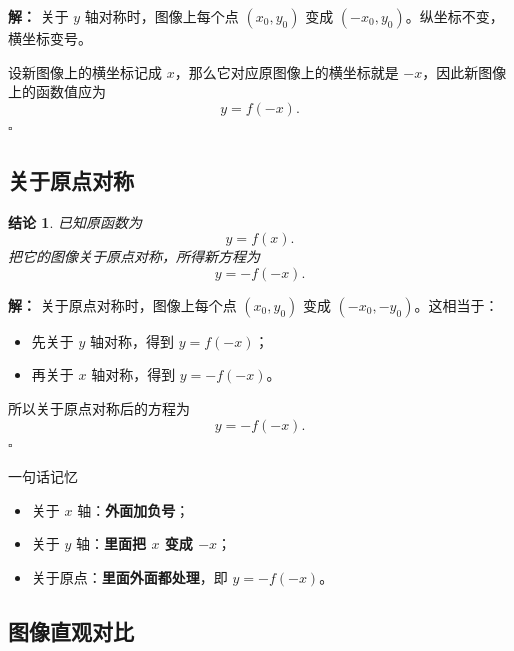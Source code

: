 \documentclass[11pt,a4paper,fontset=fandol]{ctexart}
\theoremstyle{formaltheorem}
\newtheorem{theorem}{结论}[section]
\theoremstyle{formalexample}
\newenvironment{solution}{\par\noindent\textbf{解：}}{\hfill$\square$\par}
\begin{document}
\begin{solution}
关于 $y$ 轴对称时，图像上每个点 $(x_0,y_0)$ 变成 $(-x_0,y_0)$。纵坐标不变，横坐标变号。

设新图像上的横坐标记成 $x$，那么它对应原图像上的横坐标就是 $-x$，因此新图像上的函数值应为
\[
y=f(-x).
\]
\end{solution}

\subsection{关于原点对称}

\begin{theorem}
已知原函数为
\[
y=f(x).
\]
把它的图像关于原点对称，所得新方程为
\[
y=-f(-x).
\]
\end{theorem}

\begin{solution}
关于原点对称时，图像上每个点 $(x_0,y_0)$ 变成 $(-x_0,-y_0)$。这相当于：
\begin{itemize}
  \item 先关于 $y$ 轴对称，得到 $y=f(-x)$；
  \item 再关于 $x$ 轴对称，得到 $y=-f(-x)$。
\end{itemize}
所以关于原点对称后的方程为
\[
y=-f(-x).
\]
\end{solution}

\begin{skillbox}{一句话记忆}
\begin{itemize}
  \item 关于 $x$ 轴：\textbf{外面加负号}；
  \item 关于 $y$ 轴：\textbf{里面把 $x$ 变成 $-x$}；
  \item 关于原点：\textbf{里面外面都处理}，即 $y=-f(-x)$。
\end{itemize}
\end{skillbox}

\subsection{图像直观对比}
\end{document}
